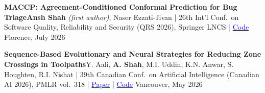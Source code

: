 
\begin{cventries}

  \cventrynew
    {{\bf MACCP: Agreement-Conditioned Conformal Prediction for Bug Triage}\newline \textnormal{{\bf Ansh Shah} \textit{(first author)}, Naser Ezzati-Jivan | 26th Int'l Conf.\ on Software Quality, Reliability and Security (QRS 2026), Springer LNCS | \href{https://github.com/Git-Ansh/maccp-conformal-triage-qrs2026}{\textcolor{blue}{Code}}}} %
    {Florence, July 2026} %
    {}
\vspace{-5mm}

  \cventrynew
    {{\bf Sequence-Based Evolutionary and Neural Strategies for Reducing Zone Crossings in Toolpaths}\newline \textnormal{Y. Aali, {\bf A. Shah}, M.I. Uddin, K.N. Anwar, S. Houghten, R.I. Nishat | 39th Canadian Conf.\ on Artificial Intelligence (Canadian AI 2026), PMLR vol.\ 318 | \href{https://proceedings.mlr.press/v318/aali26a.html}{\textcolor{blue}{Paper}} | \href{https://github.com/yasaminaali/3D-SGAHNN}{\textcolor{blue}{Code}}}} %
    {Vancouver, May 2026} %
    {}
\vspace{-7mm}

\end{cventries}
